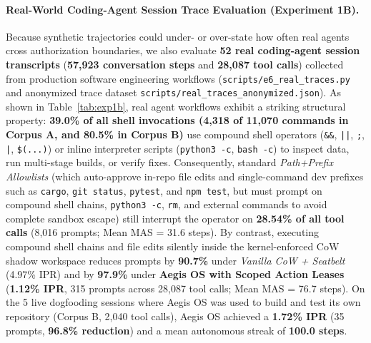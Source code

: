 \documentclass[acmsmall,screen,review]{acmart}
\begin{document}
\paragraph{Real-World Coding-Agent Session Trace Evaluation (Experiment 1B).} Because synthetic trajectories could under- or over-state how often real agents cross authorization boundaries, we also evaluate \textbf{52 real coding-agent session transcripts} (\textbf{57,923 conversation steps} and \textbf{28,087 tool calls}) collected from production software engineering workflows (\texttt{scripts/e6\_real\_traces.py} and anonymized trace dataset \texttt{scripts/real\_traces\_anonymized.json}). As shown in Table~\ref{tab:exp1b}, real agent workflows exhibit a striking structural property: \textbf{39.0\% of all shell invocations (4,318 of 11,070 commands in Corpus A, and 80.5\% in Corpus B)} use compound shell operators (\texttt{\&\&}, \texttt{||}, \texttt{;}, \texttt{|}, \texttt{\$(...)}) or inline interpreter scripts (\texttt{python3 -c}, \texttt{bash -c}) to inspect data, run multi-stage builds, or verify fixes. Consequently, standard \emph{Path+Prefix Allowlists} (which auto-approve in-repo file edits and single-command dev prefixes such as \texttt{cargo}, \texttt{git status}, \texttt{pytest}, and \texttt{npm test}, but must prompt on compound shell chains, \texttt{python3 -c}, \texttt{rm}, and external commands to avoid complete sandbox escape) still interrupt the operator on \textbf{28.54\% of all tool calls} (8,016 prompts; Mean MAS = 31.6 steps). By contrast, executing compound shell chains and file edits silently inside the kernel-enforced CoW shadow workspace reduces prompts by \textbf{90.7\%} under \emph{Vanilla CoW + Seatbelt} (4.97\% IPR) and by \textbf{97.9\%} under \textbf{Aegis OS with Scoped Action Leases} (\textbf{1.12\% IPR}, 315 prompts across 28,087 tool calls; Mean MAS = 76.7 steps). On the 5 live dogfooding sessions where Aegis OS was used to build and test its own repository (Corpus B, 2,040 tool calls), Aegis OS achieved a \textbf{1.72\% IPR} (35 prompts, \textbf{96.8\% reduction}) and a mean autonomous streak of \textbf{100.0 steps}.
\end{document}
